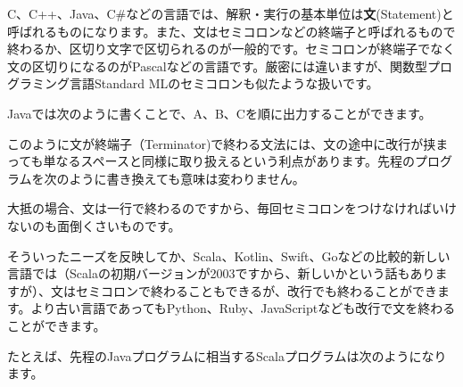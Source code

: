 C、C++、Java、C\#などの言語では、解釈・実行の基本単位は\textbf{文}(Statement)と呼ばれるものになります。また、文はセミコロンなどの終端子と呼ばれるもので終わるか、区切り文字で区切られるのが一般的です。セミコロンが終端子でなく文の区切りになるのがPascalなどの言語です。厳密には違いますが、関数型プログラミング言語Standard
MLのセミコロンも似たような扱いです。

Javaでは次のように書くことで、A、B、Cを順に出力することができます。

\begin{Shaded}
\begin{Highlighting}[]
\NormalTok{(}\NormalTok{);}
\NormalTok{(}\NormalTok{);}
\NormalTok{(}\NormalTok{);}
\end{Highlighting}
\end{Shaded}

このように文が終端子（Terminator)で終わる文法には、文の途中に改行が挟まっても単なるスペースと同様に取り扱えるという利点があります。先程のプログラムを次のように書き換えても意味は変わりません。

\begin{Shaded}
\begin{Highlighting}[]
\NormalTok{(}
  \NormalTok{);}
\NormalTok{(}
  \NormalTok{);}
\NormalTok{(}
  \NormalTok{);}
\end{Highlighting}
\end{Shaded}

大抵の場合、文は一行で終わるのですから、毎回セミコロンをつけなければいけないのも面倒くさいものです。

そういったニーズを反映してか、Scala、Kotlin、Swift、Goなどの比較的新しい言語では（Scalaの初期バージョンが2003ですから、新しいかという話もありますが）、文はセミコロンで終わることもできるが、改行でも終わることができます。より古い言語であってもPython、Ruby、JavaScriptなども改行で文を終わることができます。

たとえば、先程のJavaプログラムに相当するScalaプログラムは次のようになります。

